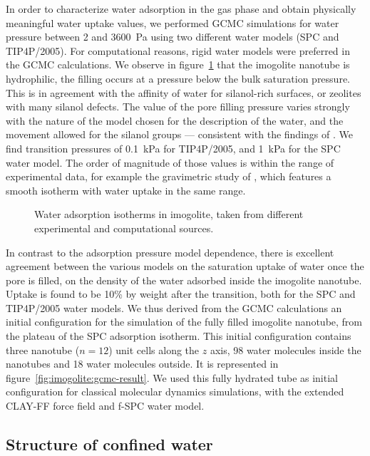 \documentclass[thesis]{subfiles}
\begin{document}
In order to characterize water adsorption in the gas phase and obtain physically
meaningful water uptake values, we performed GCMC simulations for water pressure
between 2 and \SI{3600}{Pa} using two different water models (SPC and
TIP4P/2005). For computational reasons, rigid water models were preferred in the
GCMC calculations. We observe in figure~\ref{fig:imogolite:isotherms} that the
imogolite nanotube is hydrophilic, \ie the filling occurs at a pressure below
the bulk saturation pressure. This is in agreement with the affinity of water
for silanol-rich surfaces, or zeolites with many silanol
defects\cite{Coudert2009}. The value of the pore filling pressure varies
strongly with the nature of the model chosen for the description of the water,
and the movement allowed for the silanol groups --- consistent with the findings
of \citeauthor{Zang2010}\cite{Zang2010}. We find transition pressures of
\SI{0.1}{kPa} for TIP4P/2005, and \SI{1}{kPa} for the SPC water model. The order
of magnitude of those values is within the range of experimental data, for
example the gravimetric study of \citeauthor{Konduri2008}\cite{Konduri2008},
which features a smooth isotherm with water uptake in the same range.

\begin{figure}[ht]
    \centering
    
    \caption{Water adsorption isotherms in imogolite, taken from different
    experimental and computational sources.}
    \label{fig:imogolite:isotherms}
\end{figure}

In contrast to the adsorption pressure model dependence, there is excellent
agreement between the various models on the saturation uptake of water once the
pore is filled, \ie on the density of the water adsorbed inside the imogolite
nanotube. Uptake is found to be 10\% by weight after the transition, both for
the SPC and TIP4P/2005 water models. We thus derived from the GCMC calculations
an initial configuration for the simulation of the fully filled imogolite
nanotube, from the plateau of the SPC adsorption isotherm. This initial
configuration contains three nanotube ($n=12$) unit cells along the $z$ axis, 98
water molecules inside the nanotubes and 18 water molecules outside. It is
represented in figure~\ref{fig:imogolite:gcmc-result}. We used this fully
hydrated tube as initial configuration for classical molecular dynamics
simulations, with the extended CLAY-FF force field and f-SPC water model.

\subsection{Structure of confined water}
\end{document}
